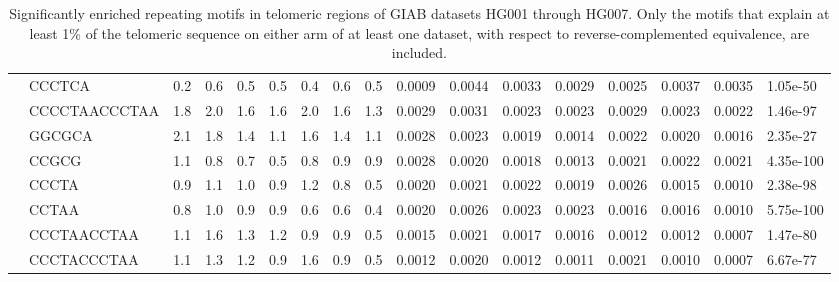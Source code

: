 \begin{landscape}
\begin{samepage}
\begin{table}[h!]
\begin{tabular}{lllllllllllllllll}
\textbf{}    &         CCCTCA &  0.2  &  0.6  &  0.5  &  0.5  &  0.4  &  0.6  &  0.5  &  0.0009 &  0.0044 &  0.0033 &  0.0029 &  0.0025 &  0.0037 &  0.0035 &   1.05e-50 \\
\textbf{}    &  CCCCTAACCCTAA &  1.8  &  2.0  &  1.6  &  1.6  &  2.0  &  1.6  &  1.3  &  0.0029 &  0.0031 &  0.0023 &  0.0023 &  0.0029 &  0.0023 &  0.0022 &   1.46e-97 \\
\textbf{}    &         GGCGCA &  2.1  &  1.8  &  1.4  &  1.1  &  1.6  &  1.4  &  1.1  &  0.0028 &  0.0023 &  0.0019 &  0.0014 &  0.0022 &  0.0020 &  0.0016 &   2.35e-27 \\
\textbf{}    &          CCGCG &  1.1  &  0.8  &  0.7  &  0.5  &  0.8  &  0.9  &  0.9  &  0.0028 &  0.0020 &  0.0018 &  0.0013 &  0.0021 &  0.0022 &  0.0021 &  4.35e-100 \\
\textbf{}    &          CCCTA &  0.9  &  1.1  &  1.0  &  0.9  &  1.2  &  0.8  &  0.5  &  0.0020 &  0.0021 &  0.0022 &  0.0019 &  0.0026 &  0.0015 &  0.0010 &   2.38e-98 \\
\textbf{}    &          CCTAA &  0.8  &  1.0  &  0.9  &  0.9  &  0.6  &  0.6  &  0.4  &  0.0020 &  0.0026 &  0.0023 &  0.0023 &  0.0016 &  0.0016 &  0.0010 &  5.75e-100 \\
\textbf{}    &    CCCTAACCTAA &  1.1  &  1.6  &  1.3  &  1.2  &  0.9  &  0.9  &  0.5  &  0.0015 &  0.0021 &  0.0017 &  0.0016 &  0.0012 &  0.0012 &  0.0007 &   1.47e-80 \\
\textbf{}    &    CCCTACCCTAA &  1.1  &  1.3  &  1.2  &  0.9  &  1.6  &  0.9  &  0.5  &  0.0012 &  0.0020 &  0.0012 &  0.0011 &  0.0021 &  0.0010 &  0.0007 &   6.67e-77 \\
\hline
\end{tabular}
\caption{
    \small Significantly enriched repeating motifs in telomeric regions of GIAB datasets HG001 through HG007.
    Only the motifs that explain at least 1\% of the telomeric sequence on either arm of at least one dataset, with respect to reverse-complemented equivalence, are included.
}
\label{tab:repeatfinder}
\end{table}
\end{samepage}
\end{landscape}
